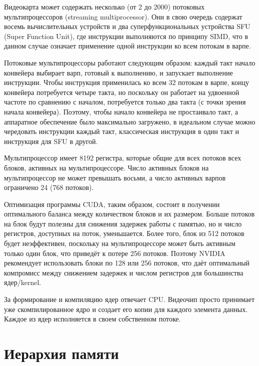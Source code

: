 \documentclass[a4paper,14pt,russian]{extreport}
\begin{document}
\par
Видеокарта может содержать несколько (от 2 до 2000) потоковых мультипроцессоров (streaming multiprocessor). Они в свою очередь содержат восемь вычислительных устройств и два суперфункциональных устройства SFU (Super Function Unit), где инструкции выполняются по принципу SIMD, что в данном случае означает применение одной инструкции ко всем потокам в варпе.
\par 
Потоковые мультипроцессоры работают следующим образом: каждый такт начало конвейера выбирает варп, готовый к выполнению, и запускает выполнение инструкции. Чтобы инструкция применилась ко всем 32 потокам в варпе, концу конвейера потребуется четыре такта, но поскольку он работает на удвоенной частоте по сравнению с началом, потребуется только два такта (с точки зрения начала конвейера). Поэтому, чтобы начало конвейера не простаивало такт, а аппаратное обеспечение было максимально загружено, в идеальном случае можно чередовать инструкции каждый такт, классическая инструкция в один такт и инструкция для SFU в другой.
\par 
Мультипроцессор имеет 8192 регистра, которые общие для всех потоков всех блоков, активных на мультипроцессоре. Число активных блоков на мультипроцессор не может превышать восьми, а число активных варпов ограничено 24 (768 потоков).
\par 
Оптимизация программы CUDA, таким образом, состоит в получении оптимального баланса между количеством блоков и их размером. Больше потоков на блок будут полезны для снижения задержек работы с памятью, но и число регистров, доступных на поток, уменьшается. Более того, блок из 512 потоков будет неэффективен, поскольку на мультипроцессоре может быть активным только один блок, что приведёт к потере 256 потоков. Поэтому NVIDIA рекомендует использовать блоки по 128 или 256 потоков, что даёт оптимальный компромисс между снижением задержек и числом регистров для большинства ядер/kernel.
\par 
За формирование и компиляцию ядер отвечает CPU. Видеочип просто
принимает уже скомпилированное ядро и создает его копии для каждого
элемента данных. Каждое из ядер исполняется в своем собственном потоке.

\section{Иерархия памяти}
\end{document}
